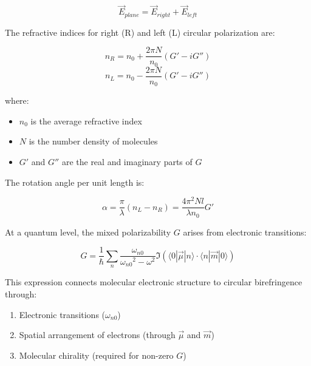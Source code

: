 \documentclass[
  a4paper,
]{book}
\providecommand{\tightlist}{%
  \setlength{\itemsep}{0pt}\setlength{\parskip}{0pt}}
\begin{document}
\[\vec{E}_{plane} = \vec{E}_{right} + \vec{E}_{left}\]

The refractive indices for right (R) and left (L) circular polarization
are:

\[n_R = n_0 + \frac{2\pi N}{n_0}(G' - iG'')\]
\[n_L = n_0 - \frac{2\pi N}{n_0}(G' - iG'')\]

where:

\begin{itemize}
\tightlist
\item
  \(n_0\) is the average refractive index
\item
  \(N\) is the number density of molecules
\item
  \(G'\) and \(G''\) are the real and imaginary parts of \(G\)
\end{itemize}

The rotation angle per unit length is:

\[\alpha = \frac{\pi}{\lambda}(n_L - n_R) = \frac{4\pi^2 Nl}{\lambda n_0}G'\]

\begin{tcolorbox}[enhanced jigsaw, coltitle=black, title=\textcolor{quarto-callout-note-color}{\faInfo}\hspace{0.5em}{Quantum Mechanical Foundation}, colframe=quarto-callout-note-color-frame, toprule=.15mm, opacitybacktitle=0.6, left=2mm, opacityback=0, breakable, toptitle=1mm, bottomtitle=1mm, leftrule=.75mm, arc=.35mm, titlerule=0mm, colbacktitle=quarto-callout-note-color!10!white, rightrule=.15mm, bottomrule=.15mm, colback=white]

At a quantum level, the mixed polarizability \(G\) arises from
electronic transitions:

\[G = \frac{1}{\hbar}\sum_n \frac{\omega_{n0}}{{\omega_{n0}}^2 - \omega^2}\Im(\langle 0|\vec{\mu}|n\rangle \cdot \langle n|\vec{m}|0\rangle)\]

This expression connects molecular electronic structure to circular
birefringence through:

\begin{enumerate}
\def\labelenumi{\arabic{enumi}.}
\tightlist
\item
  Electronic transitions (\(\omega_{n0}\))
\item
  Spatial arrangement of electrons (through \(\vec{\mu}\) and
  \(\vec{m}\))
\item
  Molecular chirality (required for non-zero \(G\))
\end{enumerate}

\end{tcolorbox}
\end{document}
